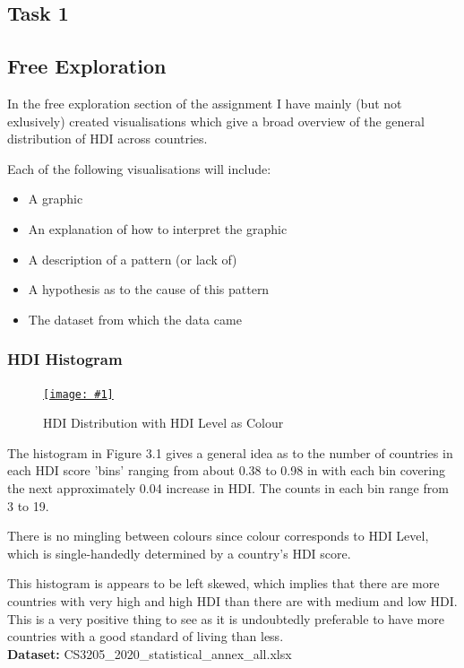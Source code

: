 \documentclass[11pt,a4paper,final]{article}
\newcommand\onlinefig[3]{
\begin{figure}[H]
  \centering
  \href{#3}{\texttt{[image: \#1]}}
  \caption{#2} 
  \label{fig:#1}
\end{figure}
}
\begin{document}
\pagebreak
\begin{multicols}{2}
\section{Task 1}
\subsection{Free Exploration}
In the free exploration section of the assignment I have mainly (but not exlusively) created visualisations which give a broad overview of the general distribution of HDI across countries.

Each of the following visualisations will include:
\begin{itemize}
	\item A graphic
	\item An explanation of how to interpret the graphic
	\item A description of a pattern (or lack of)
	\item A hypothesis as to the cause of this pattern
	\item The dataset from which the data came
\end{itemize}

\subsubsection{HDI Histogram}
\onlinefig{hdi_histogram}{HDI Distribution with HDI Level as Colour}{https://public.tableau.com/views/CS3205-HDI/Sheet6?:language=en-GB&:display_count=n&:origin=viz_share_link}

The histogram in Figure 3.1 gives a general idea as to the number of countries in each HDI score 'bins' ranging from about 0.38 to 0.98 in with each bin covering the next approximately 0.04 increase in HDI. The counts in each bin range from 3 to 19.

There is no mingling between colours since colour corresponds to HDI Level, which is single-handedly determined by a country's HDI score.

This histogram is appears to be left skewed, which implies that there are more countries with very high and high HDI than there are with medium and low HDI. This is a very positive thing to see as it is undoubtedly preferable to have more countries with a good standard of living than less.
\\
\textbf{Dataset:} CS3205\_2020\_statistical\_annex\_all.xlsx



\end{multicols}
\end{document}
